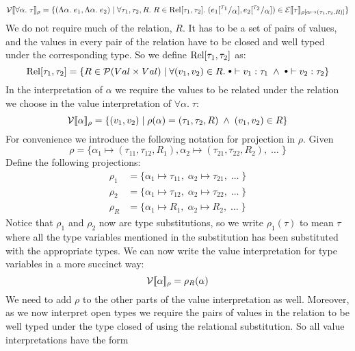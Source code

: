 \[
  \vprep{\forall \alpha.\; \tau}  = \{(\tLabs{e_1},\tLabs{e_2}) \vbar 
  \forall \tau_1 , \tau_2, R. \; 
    R \in \Rel[\tau_1,\tau_2].\;
      (\subst{e_1}{\tau_1}{\alpha},\subst{e_2}{\tau_2}{\alpha}) \in \eprep[\extsub{\rho}{\alpha}{(\tau_1,\tau_2,R)}]{\tau} \} 
\]
We do not require much of the relation, $R$. It has to be a set of pairs of values, and the values in every pair of the relation have to be closed and well typed under the corresponding type. So we define $\Rel[\tau_1,\tau_2]$ as:
\[
\Rel[\tau_1,\tau_2] = \{R \in \curly{P}(Val \times Val) \vbar \forall (v_1,v_2) \in R. \; \mtenv \vdash v_1 : \tau_1 \pand \mtenv \vdash v_2 : \tau_2 \}
\]
In the interpretation of $\alpha$ we require the values to be related under the relation we choose in the value interpretation of $\forall \alpha. \; \tau$:
\[
  \vprep{\alpha} = \{ (v_1,v_2) \vbar \rho(\alpha) = (\tau_1,\tau_2,R) \pand (v_1,v_2) \in R \}
\]
For convenience we introduce the following notation for projection in $\rho$. Given
\[
  \rho = \{\alpha_1 \mapsto (\tau_{11},\tau_{12},R_1), \alpha_2 \mapsto (\tau_{21},\tau_{22},R_2),\; \dots\; \}
\]
Define the following projections:
\begin{align*}
  \rho_1 & = \{\alpha_1 \mapsto \tau_{11}, \; \alpha_2 \mapsto \tau_{21},\; \dots \;\} \\
  \rho_2 & = \{\alpha_1 \mapsto \tau_{12}, \; \alpha_2 \mapsto \tau_{22},\; \dots \;\} \\
  \rho_R & = \{\alpha_1 \mapsto R_1, \; \alpha_2 \mapsto R_2,\; \dots \;\} 
\end{align*}
Notice that $\rho_1$ and $\rho_2$ now are type substitutions, so we write $\rho_1(\tau)$ to mean $\tau$ where all the type variables mentioned in the substitution has been substituted with the appropriate types. We can now write the value interpretation for type variables in a more succinct way:
\[
  \vprep{\alpha} = \rho_R(\alpha)
\]
We need to add $\rho$ to the other parts of the value interpretation as well. Moreover, as we now interpret open types we require the pairs of values in the relation to be well typed under the type closed of using the relational substitution. So all value interpretations have the form
